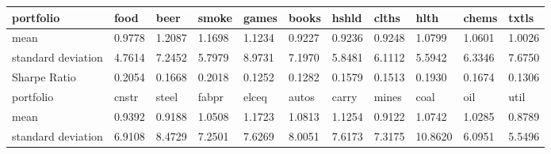\documentclass{report}
\begin{document}
\begin{table}[H]
\begin{tabular}{@{}|l|llllllllll@{}}
\toprule
portfolio          & \multicolumn{1}{l|}{food}  & \multicolumn{1}{l|}{beer}  & \multicolumn{1}{l|}{smoke} & \multicolumn{1}{l|}{games} & \multicolumn{1}{l|}{books} & \multicolumn{1}{l|}{hshld} & \multicolumn{1}{l|}{clths} & \multicolumn{1}{l|}{hlth}  & \multicolumn{1}{l|}{chems} & \multicolumn{1}{l|}{txtls} \\ \midrule
mean               & 0.9778                     & 1.2087                     & 1.1698                     & 1.1234                     & 0.9227                     & 0.9236                     & 0.9248                     & 1.0799                     & 1.0601                     & 1.0026                     \\ \cmidrule(r){1-1}
standard deviation & 4.7614                     & 7.2452                     & 5.7979                     & 8.9731                     & 7.1970                     & 5.8481                     & 6.1112                     & 5.5942                     & 6.3346                     & 7.6750                     \\ \cmidrule(r){1-1}
Sharpe Ratio       & 0.2054                     & 0.1668                     & 0.2018                     & 0.1252                     & 0.1282                     & 0.1579                     & 0.1513                     & 0.1930                     & 0.1674                     & 0.1306                     \\ \midrule
portfolio          & \multicolumn{1}{l|}{cnstr} & \multicolumn{1}{l|}{steel} & \multicolumn{1}{l|}{fabpr} & \multicolumn{1}{l|}{elceq} & \multicolumn{1}{l|}{autos} & \multicolumn{1}{l|}{carry} & \multicolumn{1}{l|}{mines} & \multicolumn{1}{l|}{coal}  & \multicolumn{1}{l|}{oil}   & \multicolumn{1}{l|}{util}  \\ \midrule
mean               & 0.9392                     & 0.9188                     & 1.0508                     & 1.1723                     & 1.0813                     & 1.1254                     & 0.9122                     & 1.0742                     & 1.0285                     & 0.8789                     \\ \cmidrule(r){1-1}
standard deviation & 6.9108                     & 8.4729                     & 7.2501                     & 7.6269                     & 8.0051                     & 7.6173                     & 7.3175                     & 10.8620                    & 6.0951                     & 5.5496                     \\ \cmidrule(r){1-1}

\end{tabular}
\end{table}
\end{document}
